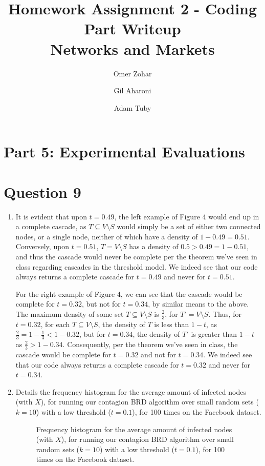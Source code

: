 \documentclass{article}
\title{
    Homework Assignment 2 - Coding Part Writeup\\
    Networks and Markets
}
\author{
    Omer Zohar
    \and
    Gil Aharoni
    \and
    Adam Tuby
}
\begin{document}
\maketitle

\section*{Part 5: Experimental Evaluations}
\setcounter{section}{0}

\section{Question 9}

\begin{enumerate}[label=(\alph*)]
    \item It is evident that upon $t = 0.49$, the left example of Figure 4 would end up in a complete cascade, as $T \subseteq V \setminus S$ would simply be a set of either two connected nodes, or a single node, neither of which have a density of $1 - 0.49 = 0.51$. Conversely, upon $t = 0.51$, $T = V \setminus S$ has a density of $0.5 > 0.49 = 1 - 0.51$, and thus the cascade would never be complete per the theorem we've seen in class regarding cascades in the threshold model. We indeed see that our code always returns a complete cascade for $t = 0.49$ and never for $t = 0.51$.
    
    For the right example of Figure 4, we can see that the cascade would be complete for $t = 0.32$, but not for $t = 0.34$, by similar means to the above. The maximum density of some set $T \subseteq V \setminus S$ is $\frac{2}{3}$, for $T' = V \setminus S$. Thus, for $t = 0.32$, for each $T \subseteq V \setminus S$, the density of $T$ is less than $1 - t$, as $\frac{2}{3} = 1 - \frac{1}{3} < 1 - 0.32$, but for $t = 0.34$, the density of $T'$ is greater than $1 - t$ as $\frac{2}{3} > 1 - 0.34$. Consequently, per the theorem we've seen in class, the cascade would be complete for $t = 0.32$ and not for $t = 0.34$. We indeed see that our code always returns a complete cascade for $t = 0.32$ and never for $t = 0.34$.
    
    \item {} Details the frequency histogram for the average amount of infected nodes (with $X$), for running our contagion BRD algorithm over small random sets ($k = 10$) with a low threshold ($t = 0.1$), for 100 times on the Facebook dataset.
    
    \begin{figure*}[h]
        \centering
        \resizebox{0.6\textwidth}{!}{
            
        }
        \caption{Frequency histogram for the average amount of infected nodes (with $X$), for running our contagion BRD algorithm over small random sets ($k = 10$) with a low threshold ($t = 0.1$), for 100 times on the Facebook dataset.}
        \label{fig:q9b}
    \end{figure*}


\end{enumerate}
\end{document}
